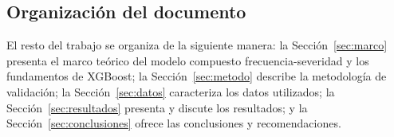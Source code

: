 \subsection{Organización del documento}

El resto del trabajo se organiza de la siguiente manera: la Sección~\ref{sec:marco} presenta el marco teórico del modelo compuesto frecuencia-severidad y los fundamentos de XGBoost; la Sección~\ref{sec:metodo} describe la metodología de validación; la Sección~\ref{sec:datos} caracteriza los datos utilizados; la Sección~\ref{sec:resultados} presenta y discute los resultados; y la Sección~\ref{sec:conclusiones} ofrece las conclusiones y recomendaciones.
